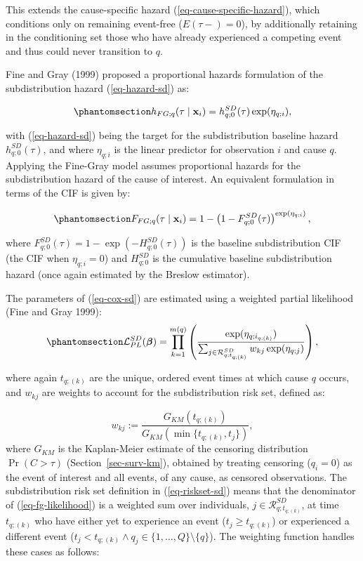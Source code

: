 \documentclass[
  letterpaper,
  krantz2]{style/krantz}
\begin{document}
This extends the cause-specific hazard (\ref{eq-cause-specific-hazard}),
which conditions only on remaining event-free (\(E(\tau-) = 0\)), by
additionally retaining in the conditioning set those who have already
experienced a competing event and thus could never transition to \(q\).

Fine and Gray (1999) proposed a proportional hazards formulation of the
subdistribution hazard (\ref{eq-hazard-sd}) as:

\begin{equation}\phantomsection\label{eq-cox-sd}{
h_{FG;q}(\tau \mid \mathbf{x}_i)= h^{SD}_{q;0}(\tau)\exp(\eta_{q;i}),
}\end{equation}

with (\ref{eq-hazard-sd}) being the target for the subdistribution
baseline hazard \(h^{SD}_{q;0}(\tau)\), and where \(\eta_{q;i}\) is the
linear predictor for observation \(i\) and cause \(q\). Applying the
Fine-Gray model assumes proportional hazards for the subdistribution
hazard of the cause of interest. An equivalent formulation in terms of
the CIF is given by:

\begin{equation}\phantomsection\label{eq-fg-cif}{
F_{FG;q}(\tau \mid \mathbf{x}_i) = 1 - \left(1 - F^{SD}_{q;0}(\tau)\right)^{\exp(\eta_{q;i})},
}\end{equation}

where \(F^{SD}_{q;0}(\tau) = 1 - \exp(-H^{SD}_{q;0}(\tau))\) is the
baseline subdistribution CIF (the CIF when \(\eta_{q;i} = 0\)) and
\(H^{SD}_{q;0}\) is the cumulative baseline subdistribution hazard (once
again estimated by the Breslow estimator).

The parameters of (\ref{eq-cox-sd}) are estimated using a weighted
partial likelihood (Fine and Gray 1999):
\begin{equation}\phantomsection\label{eq-fg-likelihood}{
\mathcal{L}_{PL}^{SD}(\boldsymbol{\beta}) = \prod_{k=1}^{m(q)} \left(\frac{\exp(\eta_{q;i_{q;(k)}})}{\sum_{j \in \mathcal{R}^{SD}_{q;t_{q;(k)}}} w_{kj}\exp(\eta_{q;j})}\right),
}\end{equation}

where again \(t_{q;(k)}\) are the unique, ordered event times at which
cause \(q\) occurs, and \(w_{kj}\) are weights to account for the
subdistribution risk set, defined as:

\[
w_{kj} := \frac{G_{KM}(t_{q;(k)})}{G_{KM}(\min\{t_{q;(k)}, t_j\})},
\] where \(G_{KM}\) is the Kaplan-Meier estimate of the censoring
distribution \(\Pr(C > \tau)\) (Section~\ref{sec-surv-km}), obtained by
treating censoring (\(q_i = 0\)) as the event of interest and all
events, of any cause, as censored observations.
The subdistribution risk set definition in (\ref{eq-riskset-sd}) means
that the denominator of (\ref{eq-fg-likelihood}) is a weighted sum over
individuals, \(j \in \mathcal{R}^{SD}_{q;t_{q;(k)}}\), at time
\(t_{q;(k)}\) who have either yet to experience an event
(\(t_j \geq t_{q;(k)}\)) or experienced a different event
(\(t_j < t_{q;(k)}\wedge q_j \in \{1,\ldots,Q\} \setminus \{q\}\)). The
weighting function handles these cases as follows:
\end{document}
